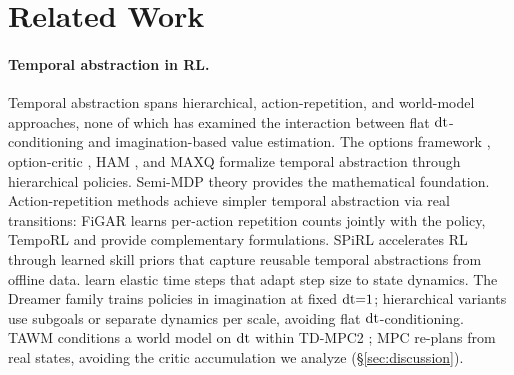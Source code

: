 \section{Related Work}
\label{sec:related_work}

\paragraph{Temporal abstraction in RL.}
 Temporal abstraction spans hierarchical, action-repetition, and world-model approaches, none of which has examined the interaction between flat $\mathrm{dt}$-conditioning and imagination-based value estimation.
The options framework \citep{sutton1999options}, option-critic \citep{bacon2017optioncritic}, HAM \citep{parr1998ham}, and MAXQ \citep{dietterich2000maxq} formalize temporal abstraction through hierarchical policies. Semi-MDP theory \citep{bradtke1995smdp} provides the mathematical foundation. Action-repetition methods achieve simpler temporal abstraction via real transitions: FiGAR \citep{sharma2017figar} learns per-action repetition counts jointly with the policy, TempoRL \citep{biedenkapp2021temporl} and \citet{park2021timediscretization} provide complementary formulations. SPiRL \citep{pertsch2020spirl} accelerates RL through learned skill priors that capture reusable temporal abstractions from offline data. \citet{wang2024elastic} learn elastic time steps that adapt step size to state dynamics. The Dreamer family \citep{hafner2020dreamerv1, hafner2021dreamerv2, hafner2025dreamerv3, hafner2025dreamerv4} trains policies in imagination at fixed $\mathrm{dt}{=}1$; hierarchical variants \citep{hafner2022director, gumbsch2024thick, mattes2024hieros, li2025lsimagine} use subgoals or separate dynamics per scale, avoiding flat $\mathrm{dt}$-conditioning. TAWM \citep{nhu2025tawm} conditions a world model on $\mathrm{dt}$ within TD-MPC2 \citep{hansen2024tdmpc2}; MPC re-plans from real states, avoiding the critic accumulation we analyze (\S\ref{sec:discussion}).

